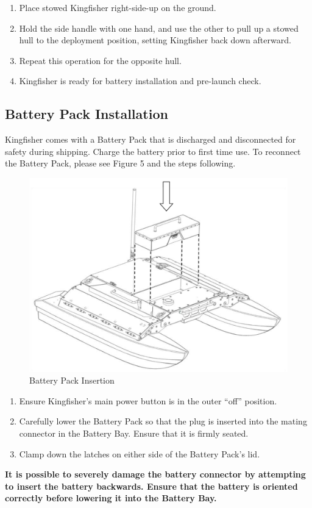 \documentclass[]{clearpath-latex/clearpath-manual}
\begin{document}
\begin{enumerate}[nolistsep]
	\item Place stowed Kingfisher right-side-up on the ground.
	\item Hold the side handle with one hand, and use the other to pull up a stowed hull to the deployment position, setting Kingfisher back down afterward.
	\item Repeat this operation for the opposite hull.
	\item Kingfisher is ready for battery installation and pre-launch check.
\end{enumerate}
\newpage

\subsection{Battery Pack Installation}
Kingfisher comes with a Battery Pack that is discharged and disconnected for safety during shipping. Charge the battery prior to first time use.
To reconnect the Battery Pack, please see Figure 5 and the steps following.

\begin{figure}[h]
  \centering
  \includegraphics[width=0.75\linewidth]{kf_batteryinstall.PNG}
  \caption{Battery Pack Insertion}
  \label{kf_batteryinstall}
\end{figure}

\begin{enumerate}[nolistsep]
	\item Ensure Kingfisher’s main power button is in the outer “off” position.
	\item Carefully lower the Battery Pack so that the plug is inserted into the mating connector in the Battery Bay. Ensure that it is firmly seated.
	\item Clamp down the latches on either side of the Battery Pack's lid.
\end{enumerate}
\textbf{It is possible to severely damage the battery connector by attempting to insert the battery backwards. Ensure that the battery is oriented correctly before lowering it into the Battery Bay.}
\newpage
\end{document}
